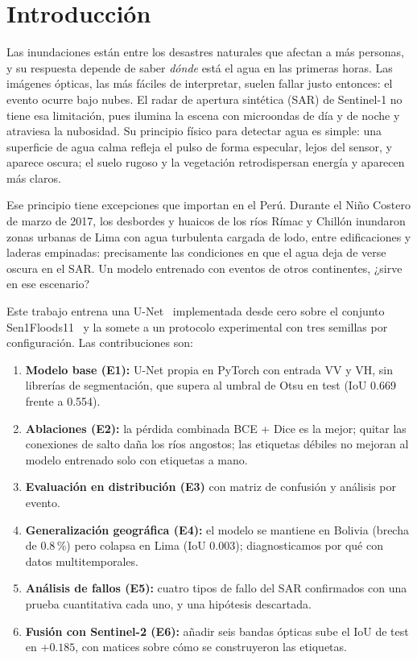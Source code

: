 \section{Introducción}
\label{sec:introduccion}

Las inundaciones están entre los desastres naturales que afectan a más personas, y su respuesta
depende de saber \emph{dónde} está el agua en las primeras horas. Las imágenes ópticas, las más
fáciles de interpretar, suelen fallar justo entonces: el evento ocurre bajo nubes. El radar de
apertura sintética (SAR) de Sentinel-1 no tiene esa limitación, pues ilumina la escena con
microondas de día y de noche y atraviesa la nubosidad. Su principio físico para detectar agua es
simple: una superficie de agua calma refleja el pulso de forma especular, lejos del sensor, y
aparece oscura; el suelo rugoso y la vegetación retrodispersan energía y aparecen más claros.

Ese principio tiene excepciones que importan en el Perú. Durante el Niño Costero de marzo de
2017, los desbordes y huaicos de los ríos Rímac y Chillón inundaron zonas urbanas de Lima con
agua turbulenta cargada de lodo, entre edificaciones y laderas empinadas: precisamente las
condiciones en que el agua deja de verse oscura en el SAR. Un modelo entrenado con eventos de
otros continentes, ¿sirve en ese escenario?

Este trabajo entrena una U-Net~\cite{ronneberger2015unet} implementada desde cero sobre el
conjunto Sen1Floods11~\cite{bonafilia2020sen1floods11} y la somete a un protocolo experimental
con tres semillas por configuración. Las contribuciones son:
\begin{enumerate}
  \item \textbf{Modelo base (E1):} U-Net propia en PyTorch con entrada VV y VH, sin librerías de
        segmentación, que supera al umbral de Otsu en test (IoU 0.669 frente a 0.554).
  \item \textbf{Ablaciones (E2):} la pérdida combinada BCE + Dice es la mejor; quitar las
        conexiones de salto daña los ríos angostos; las etiquetas débiles no mejoran al modelo
        entrenado solo con etiquetas a mano.
  \item \textbf{Evaluación en distribución (E3)} con matriz de confusión y análisis por evento.
  \item \textbf{Generalización geográfica (E4):} el modelo se mantiene en Bolivia (brecha de
        0.8\,\%) pero colapsa en Lima (IoU 0.003); diagnosticamos por qué con datos
        multitemporales.
  \item \textbf{Análisis de fallos (E5):} cuatro tipos de fallo del SAR confirmados con una prueba
        cuantitativa cada uno, y una hipótesis descartada.
  \item \textbf{Fusión con Sentinel-2 (E6):} añadir seis bandas ópticas sube el IoU de test en
        $+0.185$, con matices sobre cómo se construyeron las etiquetas.
\end{enumerate}
